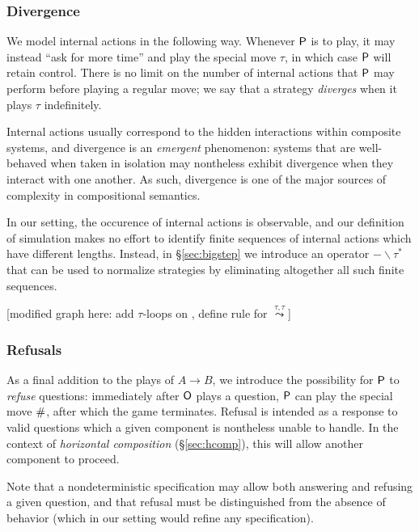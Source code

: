 \subsubsection{Divergence}

We model internal actions in the following way.
Whenever $ \mathsf{P} $ is to play,
it may instead ``ask for more time''
and play the special move $\tau$,
in which case $ \mathsf{P} $ will retain control.
There is no limit on the number of internal actions that
$ \mathsf{P} $ may perform before playing a regular move;
we say that a strategy \emph{diverges}
when it plays $\tau$ indefinitely.

Internal actions usually correspond to the hidden interactions
within composite systems, and
divergence is an \emph{emergent} phenomenon:
systems that are well-behaved when taken in isolation
may nontheless exhibit divergence when they interact with one another.
As such,
divergence is one of the major sources of complexity
in compositional semantics.

In our setting,
the occurence of internal actions
is observable,
and our definition of simulation
makes no effort
to identify finite sequences of internal actions
which have different lengths.
Instead,
in \S\ref{sec:bigstep}
we introduce an operator $- \backslash \tau^*$
that can be used to normalize strategies
by eliminating altogether all such finite sequences.

[modified graph here: add $\tau$-loops on ,
define rule for $\stackrel{\tau,\tau}{\leadsto}$]

\subsubsection{Refusals}

As a final addition to the plays of $A \rightarrow B$,
we introduce the possibility for $ \mathsf{P} $ to \emph{refuse} questions:
immediately after $ \mathsf{O} $ plays a question,
$ \mathsf{P} $ can play the special move $ \mathsf{\#} $,
after which the game terminates.
Refusal is intended as a response to valid questions
which a given component is nontheless unable to handle.
In the context of
\emph{horizontal composition} (\S\ref{sec:hcomp}),
this will allow another component to proceed.

Note that a nondeterministic specification
may allow both answering and refusing a given question,
and that refusal must be distinguished from
the absence of behavior
(which in our setting would refine any specification).

